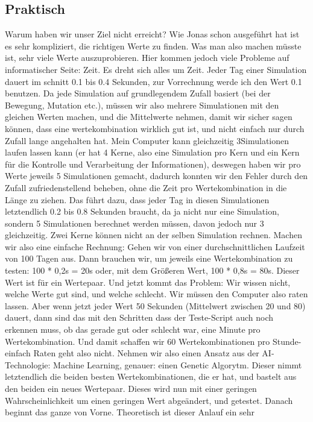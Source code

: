 \documentclass[12pt]{article}
\begin{document}
\subsection{Praktisch}
Warum haben wir unser Ziel nicht erreicht? Wie Jonas schon ausgeführt hat ist es sehr
kompliziert, die richtigen Werte zu finden. Was man also machen müsste ist, sehr viele
Werte auszuprobieren. Hier kommen jedoch viele Probleme auf informatischer Seite:
Zeit. Es dreht sich alles um Zeit. Jeder Tag einer Simulation dauert im schnitt 0.1 bis 0.4
Sekunden, zur Vorrechnung werde ich den Wert 0.1 benutzen. Da jede Simulation auf
grundlegendem Zufall basiert (bei der Bewegung, Mutation etc.), müssen wir also
mehrere Simulationen mit den gleichen Werten machen, und die Mittelwerte nehmen,
damit wir sicher sagen können, dass eine wertekombination wirklich gut ist, und nicht
einfach nur durch Zufall lange angehalten hat. Mein Computer kann gleichzeitig 3Simulationen laufen lassen kann (er hat 4 Kerne, also eine Simulation pro Kern und ein
Kern für die Kontrolle und Verarbeitung der Informationen), deswegen haben wir pro
Werte jeweils 5 Simulationen gemacht, dadurch konnten wir den Fehler durch den Zufall
zufriedenstellend beheben, ohne die Zeit pro Wertekombination in die Länge zu ziehen.
Das führt dazu, dass jeder Tag in diesen Simulationen letztendlich 0.2 bis 0.8 Sekunden
braucht, da ja nicht nur eine Simulation, sondern 5 Simulationen berechnet werden
müssen, davon jedoch nur 3 gleichzeitig. Zwei Kerne können nicht an der selben
Simulation rechnen.
Machen wir also eine einfache Rechnung: Gehen wir von einer durchschnittlichen
Laufzeit von 100 Tagen aus. Dann brauchen wir, um jeweils eine Wertekombination zu
testen: 100 * 0,2s = 20s oder, mit dem Größeren Wert, 100 * 0,8s = 80s. Dieser Wert ist
für ein Wertepaar. Und jetzt kommt das Problem: Wir wissen nicht, welche Werte gut
sind, und welche schlecht. Wir müssen den Computer also raten lassen. Aber wenn jetzt
jeder Wert 50 Sekunden (Mittelwert zwischen 20 und 80) dauert, dann sind das mit den
Schritten dass der Teste-Script auch noch erkennen muss, ob das gerade gut oder
schlecht war, eine Minute pro Wertekombination. Und damit schaffen wir 60
Wertekombinationen pro Stunde-einfach Raten geht also nicht.
Nehmen wir also einen Ansatz aus der AI-Technologie: Machine Learning, genauer:
einen Genetic Algorytm. Dieser nimmt letztendlich die beiden besten
Wertekombinationen, die er hat, und bastelt aus den beiden ein neues Wertepaar. Dieses
wird nun mit einer geringen Wahrscheinlichkeit um einen geringen Wert abgeändert, und
getestet. Danach beginnt das ganze von Vorne. Theoretisch ist dieser Anlauf ein sehr
\end{document}
